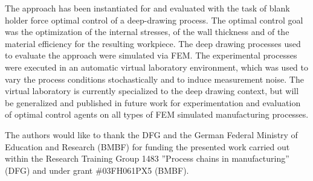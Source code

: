 The approach has been instantiated for and evaluated with the task of blank holder force optimal control of a deep-drawing process. The optimal control goal was the optimization of the internal stresses, of the wall thickness and of the material efficiency for the resulting workpiece. The deep drawing processes used to evaluate the approach were simulated via FEM. The experimental processes were executed in an automatic virtual laboratory environment, which was used to vary the process conditions stochastically and to induce measurement noise. The virtual laboratory is currently specialized to the deep drawing context, but will be generalized and published in future work for experimentation and evaluation of optimal control agents on all types of FEM simulated manufacturing processes.


\begin{comment}
Under the assumption of a limited process model, the developed model free algorithm was compared to model based non-adaptive optimal control methods Approximate Dynamic Programming and Model Predictive Control). It has been shown, that a model free algorithm is able to outperform the model based approaches in the chosen experimental scenario.
\end{comment}

\begin{comment}
Based on the proposed algorithm planned future work includes (a) the use of recurrent neural networks instead of time step dependent neural networks for better scalability to processes with larger time-horizons. (b) the incorporation of multi-objective Reinforcement Learning (\cite{Liu2015}) methods to enable transfer of learned expectation value functions between different reward-term weightings. (c) research on meta-models for detecting long-term process drifts to improve Reinforcement Learning under a non-stationary stochastic process behavior.
\end{comment}

\begin{acknowledgements}
The authors would like to thank the DFG and the German Federal Ministry of Education and Research (BMBF) for funding the presented work carried out within the Research Training Group 1483 ”Process chains in manufacturing” (DFG) and under grant \#03FH061PX5 (BMBF). \end{acknowledgements}


%
%


